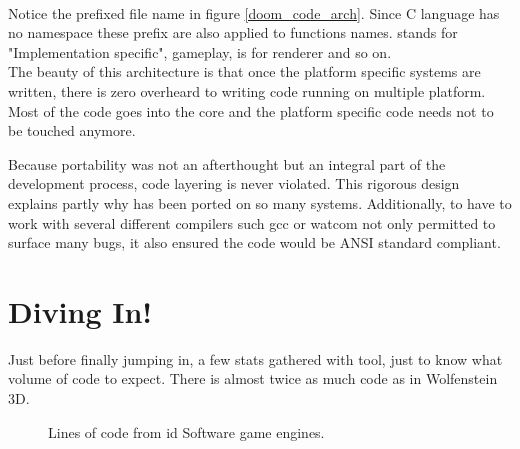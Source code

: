

\vspace{-4mm}
\\
\par
Notice the prefixed file name in figure \ref{doom_code_arch}. Since C language has no namespace these prefix are also applied to functions names.  stands for "Implementation specific",  gameplay,  is for renderer and so on.\\

The beauty of this architecture is that once the platform specific systems are written, there is zero overheard to writing code running on multiple platform. Most of the code goes into the core and the platform specific code needs not to be touched anymore.\\
\par
Because portability was not an afterthought but an integral part of the development process, \doom{} code layering is never violated. This rigorous design explains partly why \doom{} has been ported on so many systems. Additionally, to have to work with several different compilers such gcc or watcom not only permitted to surface many bugs, it also ensured the code would be ANSI standard compliant.\\

\section{Diving In!}
Just before finally jumping in, a few stats gathered with  tool, just to know what volume of code to expect. There is almost twice as much code as in Wolfenstein 3D.\\
\par
{}
\par

\par
\begin{figure}[H]
\centering
   \caption{Lines of code from id Software game engines.}
 \end{figure}
\par

